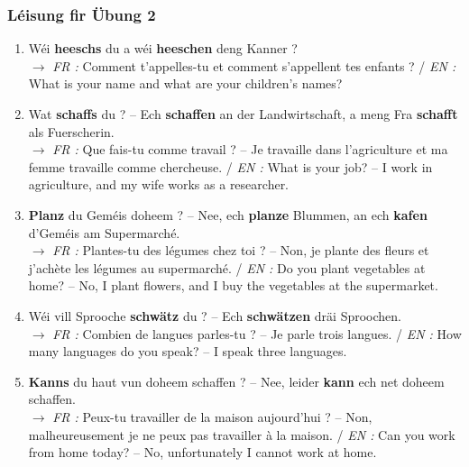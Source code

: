 \subsubsection*{Léisung fir Übung 2}
\begin{enumerate}
    \item Wéi \textbf{heeschs} du a wéi \textbf{heeschen} deng Kanner ? \\
    $\rightarrow$ \textit{FR :} Comment t'appelles-tu et comment s'appellent tes enfants ? / \textit{EN :} What is your name and what are your children's names?
    \item Wat \textbf{schaffs} du ? -- Ech \textbf{schaffen} an der Landwirtschaft, a meng Fra \textbf{schafft} als Fuerscherin. \\
    $\rightarrow$ \textit{FR :} Que fais-tu comme travail ? -- Je travaille dans l'agriculture et ma femme travaille comme chercheuse. / \textit{EN :} What is your job? -- I work in agriculture, and my wife works as a researcher.
    \item \textbf{Planz} du Geméis doheem ? -- Nee, ech \textbf{planze} Blummen, an ech \textbf{kafen} d'Geméis am Supermarché. \\
    $\rightarrow$ \textit{FR :} Plantes-tu des légumes chez toi ? -- Non, je plante des fleurs et j'achète les légumes au supermarché. / \textit{EN :} Do you plant vegetables at home? -- No, I plant flowers, and I buy the vegetables at the supermarket.
    \item Wéi vill Sprooche \textbf{schwätz} du ? -- Ech \textbf{schwätzen} dräi Sproochen. \\
    $\rightarrow$ \textit{FR :} Combien de langues parles-tu ? -- Je parle trois langues. / \textit{EN :} How many languages do you speak? -- I speak three languages.
    \item \textbf{Kanns} du haut vun doheem schaffen ? -- Nee, leider \textbf{kann} ech net doheem schaffen. \\
    $\rightarrow$ \textit{FR :} Peux-tu travailler de la maison aujourd'hui ? -- Non, malheureusement je ne peux pas travailler à la maison. / \textit{EN :} Can you work from home today? -- No, unfortunately I cannot work at home.
\end{enumerate}

